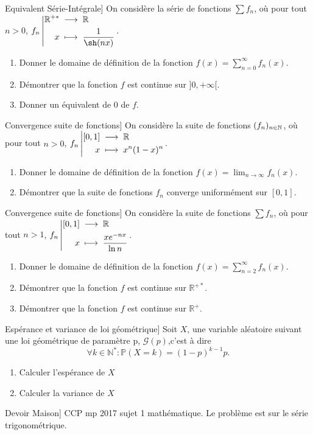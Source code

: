 \documentclass{book}
\begin{document}
\begin{Exercice}Equivalent Série-Intégrale]
On considère la série de fonctions $\sum f_n$, où pour tout $n>0$, $\Fonction{f_n}{\mathbb{R}^{+*}}{\mathbb{R}}{x}{\frac{1}{\sh (nx)}}$. 
\begin{enumerate}
\item Donner le domaine de définition de la fonction $f(x)=\sum_{n=0}^{\infty} f_n(x)$.
\item Démontrer que la fonction $f$ est continue sur $]0,+\infty[$.
\item Donner un équivalent de $0$ de $f$. 
\end{enumerate}

\end{Exercice}

\begin{Exercice}Convergence suite de fonctions]
On considère la suite de fonctions $(f_n)_{n\in\mathbb{N}}$, où pour tout $n>0$, ${f_n}\left|\begin{aligned}{[0,1]}&\;\longrightarrow\;{\mathbb{R}}\\{x}&\;\longmapsto\;{x^n(1-x)^n}\end{aligned}\right.$.  
\begin{enumerate}
\item Donner le domaine de définition de la fonction $f(x)=\lim_{n\to\infty} f_n(x)$.
\item Démontrer que la suite de fonctions $f_n$ converge uniformément sur $[0,1]$.
\end{enumerate}
\end{Exercice}


\begin{Exercice}Convergence suite de fonctions]
On considère la suite de fonctions $\sum f_n$, où pour tout $n>1$, ${f_n}\left|\begin{aligned}{[0,1]}&\;\longrightarrow\;{\mathbb{R}}\\{x}&\;\longmapsto\;{\frac{xe^{-nx}}{\ln n}}\end{aligned}\right.$.  
\begin{enumerate}
\item Donner le domaine de définition de la fonction $f(x)=\sum_{n=2}^\infty f_n(x)$.
\item Démontrer que la fonction $f$ est continue sur $\mathbb{R}^{+*}$.
\item Démontrer que la fonction $f$ est continue sur $\mathbb{R}^{+}$.
\end{enumerate}
\end{Exercice}

\begin{Exercice}Espérance et variance de loi géométrique]
Soit $X$, une variable aléatoire suivant une loi géométrique de paramètre p, $\mathcal{G}(p)$,c'est à dire  $$\forall k \in \mathbb{N}^*:\mathbb{P}(X=k)=(1-p)^{k-1}p.$$
\begin{enumerate}
\item Calculer l'espérance de $X$
\item Calculer la variance de $X$
\end{enumerate}
\end{Exercice}

\begin{Exercice}Devoir Maison]
CCP mp 2017 sujet 1 mathématique. Le problème est sur le série trigonométrique. 
\end{Exercice}
\end{document}
